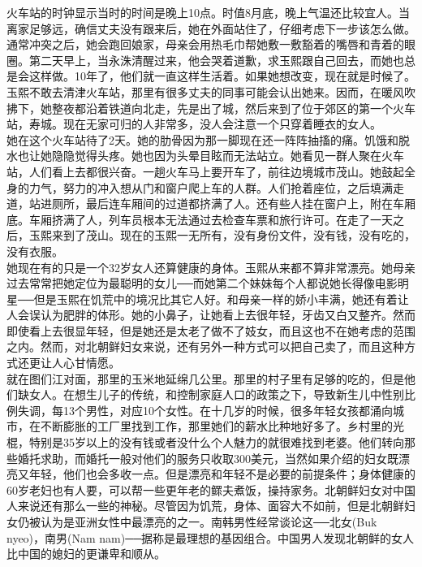 火车站的时钟显示当时的时间是晚上10点。时值8月底，晚上气温还比较宜人。当离家足够远，确信丈夫没有跟来后，她在外面站住了，仔细考虑下一步该怎么做。通常冲突之后，她会跑回娘家，母亲会用热毛巾帮她敷一敷豁着的嘴唇和青着的眼圈。第二天早上，当永洙清醒过来，他会哭着道歉，求玉熙跟自己回去，而她也总是会这样做。10年了，他们就一直这样生活着。如果她想改变，现在就是时候了。\\

玉熙不敢去清津火车站，那里有很多丈夫的同事可能会认出她来。因而，在暖风吹拂下，她整夜都沿着铁道向北走，先是出了城，然后来到了位于郊区的第一个火车站，寿城。现在无家可归的人非常多，没人会注意一个只穿着睡衣的女人。\\

她在这个火车站待了2天。她的肋骨因为那一脚现在还一阵阵抽搐的痛。饥饿和脱水也让她隐隐觉得头疼。她也因为头晕目眩而无法站立。她看见一群人聚在火车站，人们看上去都很兴奋。一趟火车马上要开车了，前往边境城市茂山。她鼓起全身的力气，努力的冲入想从门和窗户爬上车的人群。人们抢着座位，之后填满走道，站进厕所，最后连车厢间的过道都挤满了人。还有些人挂在窗户上，附在车厢底。车厢挤满了人，列车员根本无法通过去检查车票和旅行许可。在走了一天之后，玉熙来到了茂山。现在的玉熙一无所有，没有身份文件，没有钱，没有吃的，没有衣服。\\

她现在有的只是一个32岁女人还算健康的身体。玉熙从来都不算非常漂亮。她母亲过去常常把她定位为最聪明的女儿──而她第二个妹妹每个人都说她长得像电影明星──但是玉熙在饥荒中的境况比其它人好。和母亲一样的娇小丰满，她还有着让人会误认为肥胖的体形。她的小鼻子，让她看上去很年轻，牙齿又白又整齐。然而即使看上去很显年轻，但是她还是太老了做不了妓女，而且这也不在她考虑的范围之内。然而，对北朝鲜妇女来说，还有另外一种方式可以把自己卖了，而且这种方式还更让人心甘情愿。\\

就在图们江对面，那里的玉米地延绵几公里。那里的村子里有足够的吃的，但是他们缺女人。在想生儿子的传统，和控制家庭人口的政策之下，导致新生儿中性别比例失调，每13个男性，对应10个女性。在十几岁的时候，很多年轻女孩都涌向城市，在不断膨胀的工厂里找到工作，那里她们的薪水比种地好多了。乡村里的光棍，特别是35岁以上的没有钱或者没什么个人魅力的就很难找到老婆。他们转向那些婚托求助，而婚托一般对他们的服务只收取300美元，当然如果介绍的妇女既漂亮又年轻，他们也会多收一点。但是漂亮和年轻不是必要的前提条件；身体健康的60岁老妇也有人要，可以帮一些更年老的鳏夫煮饭，操持家务。北朝鲜妇女对中国人来说还有那么一些的神秘。尽管因为饥荒，身体、面容大不如前，但是北朝鲜妇女仍被认为是亚洲女性中最漂亮的之一。南韩男性经常谈论这──北女(Buk nyeo)，南男(Nam nam)──据称是最理想的基因组合。中国男人发现北朝鲜的女人比中国的媳妇的更谦卑和顺从。\\

